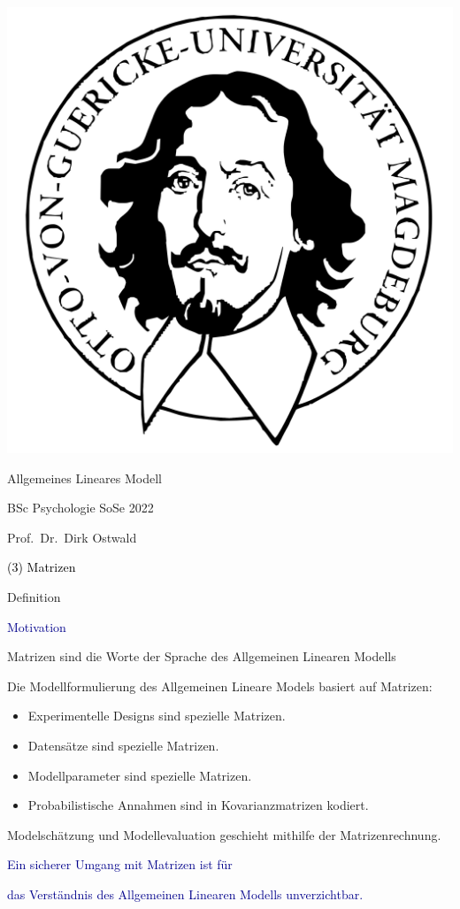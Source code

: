\documentclass[
  8pt,
  ignorenonframetext,
]{beamer}
\author{}
\date{\vspace{-2.5em}}
\providecommand{\tightlist}{%
  \setlength{\itemsep}{0pt}\setlength{\parskip}{0pt}}
\begin{document}
\begin{frame}[plain]{}
\protect\hypertarget{section}{}
\center

\begin{center}\includegraphics[width=0.2\linewidth]{3_Abbildungen/alm_3_otto} \end{center}

\vspace{2mm}

\Huge

Allgemeines Lineares Modell \vspace{6mm}

\large

BSc Psychologie SoSe 2022

\vspace{6mm}
\large

Prof.~Dr.~Dirk Ostwald
\end{frame}

\begin{frame}[plain]{}
\protect\hypertarget{section-1}{}
\vfill
\center
\huge

\textcolor{black}{(3) Matrizen} \vfill
\end{frame}

\begin{frame}{Definition}
\protect\hypertarget{definition}{}
\large

\textcolor{darkblue}{Motivation} 

\normalsize

Matrizen sind die Worte der Sprache des Allgemeinen Linearen Modells

Die Modellformulierung des Allgemeinen Lineare Models basiert auf
Matrizen:

\begin{itemize}
\tightlist
\item
  Experimentelle Designs sind spezielle Matrizen.
\item
  Datensätze sind spezielle Matrizen.
\item
  Modellparameter sind spezielle Matrizen.
\item
  Probabilistische Annahmen sind in Kovarianzmatrizen kodiert.
\end{itemize}

Modelschätzung und Modellevaluation geschieht mithilfe der
Matrizenrechnung.

\vspace{2mm}

\center
{}

\textcolor{darkblue}{Ein sicherer Umgang mit Matrizen ist für}

\textcolor{darkblue}{das Verständnis des Allgemeinen Linearen Modells unverzichtbar.}
\end{frame}
\end{document}

